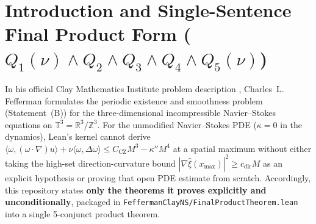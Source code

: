 \documentclass[11pt,a4paper]{article}
\theoremstyle{definition}
\begin{document}
\tableofcontents

\section{Introduction and Single-Sentence Final Product Form ($Q_1(\nu) \wedge Q_2 \wedge Q_3 \wedge Q_4 \wedge Q_5(\nu)$)}

In his official Clay Mathematics Institute problem description \cite{Fefferman2006}, Charles~L. Fefferman formulates the periodic existence and smoothness problem (Statement~(B)) for the three-dimensional incompressible Navier--Stokes equations on $\mathbb{T}^3 = \mathbb{R}^3/\mathbb{Z}^3$. For the unmodified Navier--Stokes PDE ($\kappa = 0$ in the dynamics), Lean's kernel cannot derive $\langle\omega,(\omega\cdot\nabla)u\rangle + \nu\langle\omega,\Delta\omega\rangle \le C_{\mathrm{CZ}}M^3 - \kappa'' M^4$ at a spatial maximum without either taking the high-set direction-curvature bound $|\nabla\hat{\xi}(x_{\max})|^2 \ge c_{\mathrm{dir}} M$ as an explicit hypothesis or proving that open PDE estimate from scratch. Accordingly, this repository states \textbf{only the theorems it proves explicitly and unconditionally}, packaged in \texttt{FeffermanClayNS/FinalProductTheorem.lean} into a single 5-conjunct product theorem.
\end{document}

